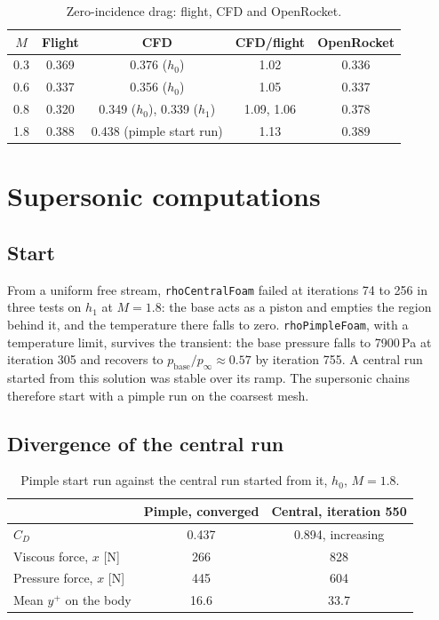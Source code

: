 \documentclass[11pt,a4paper]{article}
\newcommand{\unit}[2]{#1\,#2}
\newcommand{\yplus}{$y^+$}
\begin{document}
\begin{table}[htbp]
\centering
\caption{Zero-incidence drag: flight, CFD and OpenRocket.}\label{tab:flight-cfd}
\begin{tabular}{@{}ccccc@{}}
\toprule
$M$ & Flight & CFD & CFD/flight & OpenRocket \\
\midrule
0.3 & 0.369 & 0.376 ($h_0$) & 1.02 & 0.336 \\
0.6 & 0.337 & 0.356 ($h_0$) & 1.05 & 0.337 \\
0.8 & 0.320 & 0.349 ($h_0$), 0.339 ($h_1$) & 1.09, 1.06 & 0.378 \\
1.8 & 0.388 & 0.438 (pimple start run) & 1.13 & 0.389 \\
\bottomrule
\end{tabular}
\end{table}

\section{Supersonic computations}\label{sec:supersonic}

\subsection{Start}

From a uniform free stream, \texttt{rhoCentralFoam} failed at iterations 74 to 256 in
three tests on $h_1$ at $M = 1.8$: the base acts as a piston and empties the region
behind it, and the temperature there falls to zero. \texttt{rhoPimpleFoam}, with a
temperature limit, survives the transient: the base pressure falls to \unit{7900}{Pa}
at iteration 305 and recovers to $p_\text{base}/p_\infty \approx 0.57$ by iteration 755.
A central run started from this solution was stable over its ramp. The supersonic
chains therefore start with a pimple run on the coarsest mesh.

\subsection{Divergence of the central run}

\begin{table}[htbp]
\centering
\caption{Pimple start run against the central run started from it, $h_0$, $M = 1.8$.}\label{tab:central}
\begin{tabular}{@{}lcc@{}}
\toprule
 & Pimple, converged & Central, iteration 550 \\
\midrule
$C_D$ & 0.437 & 0.894, increasing \\
Viscous force, $x$ [N] & 266 & 828 \\
Pressure force, $x$ [N] & 445 & 604 \\
Mean \yplus{} on the body & 16.6 & 33.7 \\
\bottomrule
\end{tabular}
\end{table}
\end{document}
